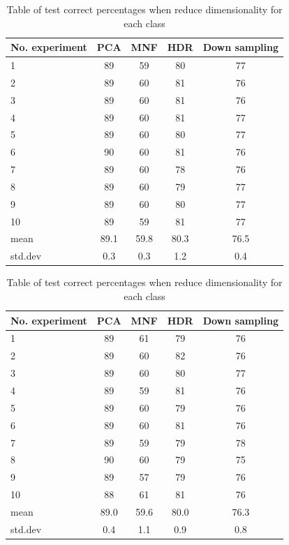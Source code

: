 \documentclass[conference,onecolumn]{IEEEtran}
\begin{document}
\begin{table}[!htb]
	\begin{minipage}{.4\linewidth}
		\centering
		\begin{tabular}{lcccc}
			\hline
			No. experiment & PCA & MNF & HDR & Down sampling\\
			\hline
			1 &  89 &  59 & 80 & 77 \\
			2 &  89 &  60 & 81 & 76 \\
			3 &  89 &  60 & 81 & 76 \\
			4 &  89 &  60 & 81 & 77 \\
			5 &  89 &  60 & 80 & 77 \\
			6 &  90 &  60 & 81 & 76 \\
			7 &  89 &  60 & 78 & 76 \\
			8 &  89 &  60 & 79 & 77 \\
			9 &  89 &  60 & 80 & 77 \\
			10 &  89 &  59 & 81 & 77 \\
			\hline
			mean & 89.1 & 59.8 & 80.3 & 76.5 \\
			std.dev & 0.3 & 0.3 & 1.2 & 0.4\\
			\hline
		\end{tabular}
		\caption{Table of training correct percentages when reduce dimensionality for each class}
	\end{minipage}
	\qquad
	\qquad
	\qquad
	\qquad
	\begin{minipage}{.4\linewidth}
		\centering
		\begin{tabular}{lcccc}
			\hline
			No. experiment & PCA & MNF & HDR & Down sampling\\
			\hline
			1 &  89 &  61 & 79 & 76 \\
			2 &  89 &  60 & 82 & 76 \\
			3 &  89 &  60 & 80 & 77 \\
			4 &  89 &  59 & 81 & 76 \\
			5 &  89 &  60 & 79 & 76 \\
			6 &  89 &  60 & 81 & 76 \\
			7 &  89 &  59 & 79 & 78 \\
			8 &  90 &  60 & 79 & 75 \\
			9 &  89 &  57 & 79 & 76 \\
			10 &  88 & 61 & 81 & 76 \\
			\hline
			mean & 89.0 & 59.6 & 80.0 & 76.3 \\
			std.dev & 0.4 & 1.1 & 0.9 & 0.8\\
			\hline
		\end{tabular}
		\caption{Table of test correct percentages when reduce dimensionality for each class}
	\end{minipage}
	\label{tab: t2}
\end{table}
\end{document}
